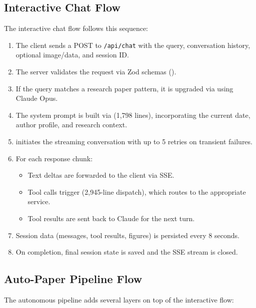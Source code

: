 \subsection{Interactive Chat Flow}

The interactive chat flow follows this sequence:

\begin{enumerate}
  \item The client sends a POST to \texttt{/api/chat} with the query, conversation history, optional image/data, and session ID.
  \item The server validates the request via Zod schemas ().
  \item If the query matches a research paper pattern, it is upgraded via  using Claude Opus.
  \item The system prompt is built via  (1,798 lines), incorporating the current date, author profile, and research context.
  \item {} initiates the streaming conversation with up to 5 retries on transient failures.
  \item For each response chunk:
    \begin{itemize}
      \item Text deltas are forwarded to the client via SSE.
      \item Tool calls trigger  (2,945-line dispatch), which routes to the appropriate service.
      \item Tool results are sent back to Claude for the next turn.
    \end{itemize}
  \item Session data (messages, tool results, figures) is persisted every 8 seconds.
  \item On completion, final session state is saved and the SSE stream is closed.
\end{enumerate}

\subsection{Auto-Paper Pipeline Flow}

The autonomous pipeline adds several layers on top of the interactive flow:

